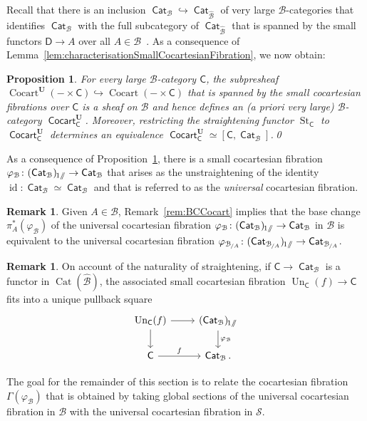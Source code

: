 \documentclass[reqno]{amsart}
\numberwithin{equation}{subsection}
\theoremstyle{plain}
\newtheorem{proposition}[equation]{Proposition}
\theoremstyle{definition}
\newtheorem{remark}[equation]{Remark}
\let\scr=\mathcal
\let\phi=\varphi
\let\into=\hookrightarrow
\def\BB{\scr B}
\def\SS{\scr S}
\def\BBB{\widehat{\BB}}
\def\bU{\mathbf{U}}
\DeclareMathOperator{\id}{id}
\DeclareMathOperator{\Cat}{Cat}
\DeclareMathOperator{\ICat}{\mathsf{Cat}}
\DeclareMathOperator{\Cocart}{Cocart}
\DeclareMathOperator{\ICocart}{\mathsf{Cocart}}
\DeclareMathOperator{\St}{St}
\DeclareMathOperator{\Un}{Un}
\newcommand{\Over}[2]{#1_{\hspace{-1pt}/#2}}
\newcommand{\sslash}{\mathbin{/\mkern-6mu/}}
\newcommand{\I}[1]{\mathsf{#1}}
\newcommand{\iFun}[2]{{[#1,#2]}}
\newcommand{\LaxUnder}[2]{#1_{\hspace{-1pt}#2\sslash}}
\begin{document}
Recall that there is an inclusion $\ICat_{\BB}\into\ICat_{\BBB}$ of very large $\BB$-categories that identifies $\ICat_{\BB}$ with the full subcategory of $\ICat_{\BBB}$ that is spanned by the small functors $\I{D}\to A$ over all $A\in\BB$~\cite[Example~2.7.6]{Martini2021a}. As a consequence of Lemma~\ref{lem:characterisationSmallCocartesianFibration}, we now obtain:
\begin{proposition}
	\label{prop:characterisationSmallCocartesianFibrations}
	For every large $\BB$-category $\I{C}$, the subpresheaf $\Cocart^{\bU}(-\times \I{C})\into\Cocart(-\times\I{C})$ that is spanned by the small cocartesian fibrations over $\I{C}$ is a sheaf on $\BB$ and hence defines an (a priori very large) $\BB$-category $\ICocart_{\I{C}}^{\bU}$. Moreover, restricting the straightening functor $\St_{\I{C}}$ to $\ICocart_{\I{C}}^{\bU}$ determines an equivalence $\ICocart_{\I{C}}^{\bU}\simeq \iFun{\I{C}}{\ICat_{\BB}}$.\qed
\end{proposition}

As a consequence of Proposition~\ref{prop:characterisationSmallCocartesianFibrations}, there is a small cocartesian fibration $\phi_{\BB}\colon\LaxUnder{(\ICat_{\BB})}{1}\to\ICat_{\BB}$ that arises as the unstraightening of the identity $\id\colon \ICat_{\BB}\simeq\ICat_{\BB}$ and that is referred to as the \emph{universal} cocartesian fibration.

\begin{remark}
	\label{rem:BCUniversalCocartesianFibration}
	Given $A\in\BB$, Remark~\ref{rem:BCCocart} implies that the base change $\pi_A^\ast(\phi_{\BB})$ of the universal cocartesian fibration $\phi_{\BB}\colon\LaxUnder{(\ICat_{\BB})}{1}\to\ICat_{\BB}$ in $\BB$ is equivalent to the universal cocartesian fibration $\phi_{\Over{\BB}{A}}\colon\LaxUnder{(\ICat_{\Over{\BB}{A}})}{1}\to\ICat_{\Over{\BB}{A}}$.
\end{remark}
\begin{remark}
	\label{rem:universalCocartesianFibration}
	On account of the naturality of straightening, if $\I{C}\to\ICat_{\BB}$ is a functor in $\Cat(\BBB)$, the associated small cocartesian fibration $\Un_{\I{C}}(f)\to\I{C}$ fits into a unique pullback square
	\begin{equation*}
	\begin{tikzcd}
	\Un_{\I{C}}(f)\arrow[d]\arrow[r] & \LaxUnder{(\ICat_{\BB})}{1}\arrow[d, "\phi_{\BB}"]\\
	\I{C}\arrow[r, "f"] & \ICat_{\BB}.
	\end{tikzcd}
	\end{equation*}
\end{remark}
The goal for the remainder of this section is to relate the cocartesian fibration $\Gamma(\phi_{\BB})$ that is obtained by taking global sections of the universal cocartesian fibration in $\BB$ with the universal cocartesian fibration in $\SS$.
\end{document}
